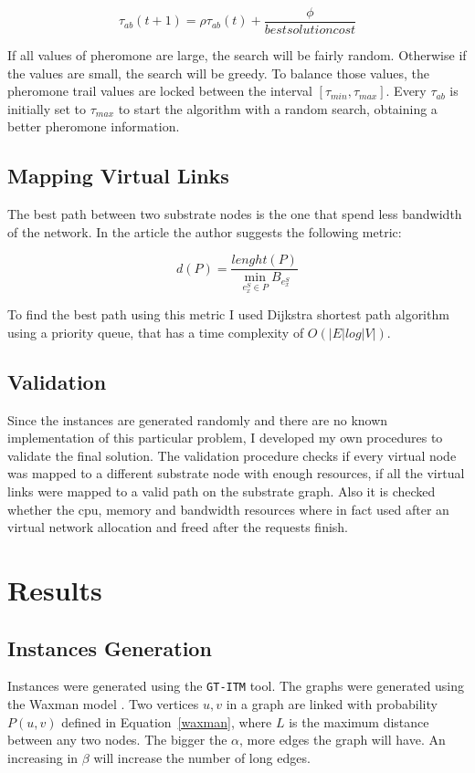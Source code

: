 \documentclass[10pt, a4paper, twocolumn]{article}
\begin{document}
\begin{equation}
  \tau_{ab}(t+1) = \rho \tau_{ab}(t) + \frac{\phi}{best solution cost}
\end{equation}

If all values of pheromone are large, the search will be fairly random. Otherwise if the values are small, the search will be greedy. To balance those values, the pheromone trail values are locked between the interval $[\tau_{min},\tau_{max}]$. Every $\tau_{ab}$ is initially set to $\tau_{max}$ to start the algorithm with a random search, obtaining a better pheromone information.

\subsection{Mapping Virtual Links} \label{path}
The best path between two substrate nodes is the one that spend less bandwidth of the network. In the article the author suggests the following metric:

\begin{equation}
  d(P) = \frac{lenght(P)}{\min_{e^{S}_{x}\in P}B_{e^{S}_{x}}}\label{metric}
\end{equation}

To find the best path using this metric I used Dijkstra shortest path algorithm using a priority queue, that has a time complexity of $O(|E| log |V|)$.

\subsection{Validation}
Since the instances are generated randomly and there are no known implementation of this particular problem, I developed my own procedures to validate the final solution. The validation procedure checks if every virtual node was mapped to a different substrate node with enough resources, if all the virtual links were mapped to a valid path on the substrate graph. Also  it is checked whether the cpu, memory and bandwidth resources where in fact used after an virtual network allocation and freed after the requests finish.

\section{Results}
\subsection{Instances Generation}
Instances were generated using the \texttt{GT-ITM} tool. The graphs were generated using the Waxman model \cite{waxman88}. Two vertices $u, v$ in a graph are linked with probability $P(u,v)$ defined in Equation~\ref{waxman}, where $L$ is the maximum distance between any two nodes. The bigger the $\alpha$, more edges the graph will have. An increasing in $\beta$ will increase the number of long edges.
\end{document}
